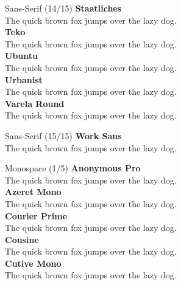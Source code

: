 \documentclass[10pt]{beamer}
\begin{document}
\begin{frame}{Sans-Serif (14/15)}
\vspace{-0.2cm}
  {\StaatlichesLocal\Large\bfseries Staatliches\\}
  {\StaatlichesLocal The quick brown fox jumps over the lazy dog.\\[0.3cm]}
  {\TekoLocal\Large\bfseries Teko\\}
  {\TekoLocal The quick brown fox jumps over the lazy dog.\\[0.3cm]}
  {\UbuntuLocal\Large\bfseries Ubuntu\\}
  {\UbuntuLocal The quick brown fox jumps over the lazy dog.\\[0.3cm]}
  {\UrbanistLocal\Large\bfseries Urbanist\\}
  {\UrbanistLocal The quick brown fox jumps over the lazy dog.\\[0.3cm]}
  {\VarelaRoundLocal\Large\bfseries Varela Round\\}
  {\VarelaRoundLocal The quick brown fox jumps over the lazy dog.\\[0.3cm]}
\end{frame}

\begin{frame}{Sans-Serif (15/15)}
\vspace{-0.2cm}
  {\WorkSansLocal\Large\bfseries Work Sans\\}
  {\WorkSansLocal The quick brown fox jumps over the lazy dog.\\[0.3cm]}
\end{frame}

\begin{frame}{Monospace (1/5)}
\vspace{-0.2cm}
  {\AnonymousProLocal\Large\bfseries Anonymous Pro\\}
  {\AnonymousProLocal The quick brown fox jumps over the lazy dog.\\[0.3cm]}
  {\AzeretMonoLocal\Large\bfseries Azeret Mono\\}
  {\AzeretMonoLocal The quick brown fox jumps over the lazy dog.\\[0.3cm]}
  {\CourierPrimeLocal\Large\bfseries Courier Prime\\}
  {\CourierPrimeLocal The quick brown fox jumps over the lazy dog.\\[0.3cm]}
  {\CousineLocal\Large\bfseries Cousine\\}
  {\CousineLocal The quick brown fox jumps over the lazy dog.\\[0.3cm]}
  {\CutiveMonoLocal\Large\bfseries Cutive Mono\\}
  {\CutiveMonoLocal The quick brown fox jumps over the lazy dog.\\[0.3cm]}
\end{frame}
\end{document}
